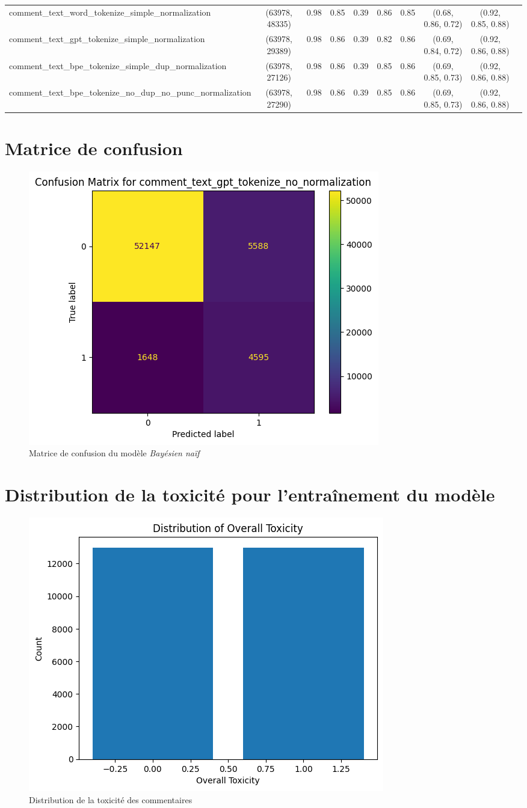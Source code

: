 \begin{table}[htbp]
{\begin{tabular}{@{}lccccccccc@{}}
    comment\_text\_word\_tokenize\_simple\_normalization & (63978, 48335) & 0.98 & 0.85 & 0.39 & 0.86 & 0.85 & (0.68, 0.86, 0.72) & (0.92, 0.85, 0.88) \\
    comment\_text\_gpt\_tokenize\_simple\_normalization & (63978, 29389) & 0.98 & 0.86 & 0.39 & 0.82 & 0.86 & (0.69, 0.84, 0.72) & (0.92, 0.86, 0.88) \\
    comment\_text\_bpe\_tokenize\_simple\_dup\_normalization & (63978, 27126) & 0.98 & 0.86 & 0.39 & 0.85 & 0.86 & (0.69, 0.85, 0.73) & (0.92, 0.86, 0.88) \\
    comment\_text\_bpe\_tokenize\_no\_dup\_no\_punc\_normalization & (63978, 27290) & 0.98 & 0.86 & 0.39 & 0.85 & 0.86 & (0.69, 0.85, 0.73) & (0.92, 0.86, 0.88) \\
    \bottomrule
    \end{tabular}%
    }
    \end{table}

    \section{Matrice de confusion}
    \begin{figure}[ht]
        \caption{Matrice de confusion du modèle \textit{Bayésien naïf}}
        \centering
        \includegraphics[width=.49\linewidth]{figures/matrix-confusion-naive_bayes.png}
    \end{figure}
\section{Distribution de la toxicité pour l'entraînement du modèle}
    \begin{figure}[ht]
        \caption{Distribution de la toxicité des commentaires}
        \centering
        \includegraphics[width=.43\linewidth]{figures/distribution-toxicity-naive_bayes.png}
    \end{figure}
